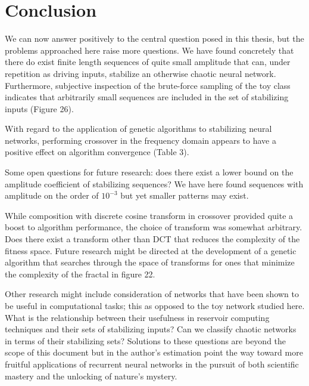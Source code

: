 \documentclass[12pt]{article}
\begin{document}
\section{Conclusion}

We can now answer positively to the central question posed in this thesis,
but the problems
approached here raise more questions.  We have found concretely that there
do exist finite length sequences of quite small amplitude that can,
under repetition as driving inputs,
stabilize an otherwise chaotic neural network.
Furthermore, subjective inspection of the brute-force sampling of the toy class 
indicates that arbitrarily small sequences are included in the set of
stabilizing inputs (Figure 26).

With regard to the application of genetic algorithms to stabilizing neural
networks, performing crossover in the frequency domain appears to have a
positive effect on algorithm convergence (Table 3).

Some open questions for future research:  does there exist a lower bound on
the amplitude coefficient of stabilizing sequences?  We have here found
sequences with amplitude on the order of $10^{-3}$ but yet smaller patterns
may exist.

While composition with discrete cosine transform in crossover
provided quite a boost to algorithm
performance, the choice of transform was somewhat arbitrary.
Does there exist a transform other than DCT that reduces the
complexity of the fitness space.  Future
research might be directed at the development of a genetic algorithm
that searches
through the space of transforms for ones that minimize the complexity of
the fractal in figure 22.

Other research might include consideration of networks that have been
shown to be useful in computational
tasks; this as opposed to the toy network studied here.  What
is the relationship between their usefulness in reservoir computing
techniques and their sets of stabilizing inputs?
Can we classify chaotic networks in terms of their
stabilizing sets?  Solutions to these questions are beyond
the scope of this document but in the author's estimation point the way toward
more fruitful applications of recurrent neural networks in the pursuit of
both scientific mastery and the unlocking of nature's mystery.
\end{document}
